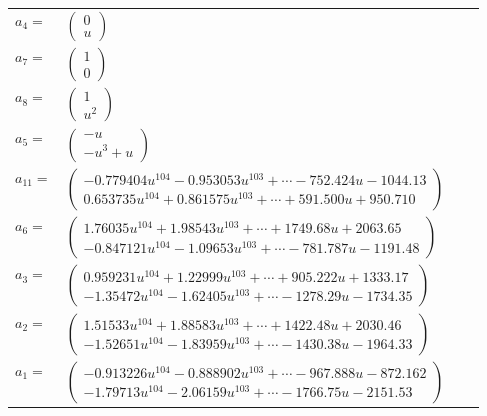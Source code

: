 \documentclass[1p]{elsarticle_modified}
\theoremstyle{definition}
\begin{document}
\begin{tabular}{m{7pt} m{180pt} m{7pt} m{180pt} }
\flushright $a_{4}=$&$\begin{pmatrix}0\\u\end{pmatrix}$ \\
\flushright $a_{7}=$&$\begin{pmatrix}1\\0\end{pmatrix}$ \\
\flushright $a_{8}=$&$\begin{pmatrix}1\\u^2\end{pmatrix}$ \\
\flushright $a_{5}=$&$\begin{pmatrix}- u\\- u^3+u\end{pmatrix}$ \\
\flushright $a_{11}=$&$\begin{pmatrix}-0.779404 u^{104}-0.953053 u^{103}+\cdots-752.424 u-1044.13\\0.653735 u^{104}+0.861575 u^{103}+\cdots+591.500 u+950.710\end{pmatrix}$ \\
\flushright $a_{6}=$&$\begin{pmatrix}1.76035 u^{104}+1.98543 u^{103}+\cdots+1749.68 u+2063.65\\-0.847121 u^{104}-1.09653 u^{103}+\cdots-781.787 u-1191.48\end{pmatrix}$ \\
\flushright $a_{3}=$&$\begin{pmatrix}0.959231 u^{104}+1.22999 u^{103}+\cdots+905.222 u+1333.17\\-1.35472 u^{104}-1.62405 u^{103}+\cdots-1278.29 u-1734.35\end{pmatrix}$ \\
\flushright $a_{2}=$&$\begin{pmatrix}1.51533 u^{104}+1.88583 u^{103}+\cdots+1422.48 u+2030.46\\-1.52651 u^{104}-1.83959 u^{103}+\cdots-1430.38 u-1964.33\end{pmatrix}$ \\
\flushright $a_{1}=$&$\begin{pmatrix}-0.913226 u^{104}-0.888902 u^{103}+\cdots-967.888 u-872.162\\-1.79713 u^{104}-2.06159 u^{103}+\cdots-1766.75 u-2151.53\end{pmatrix}$ \\

\end{tabular}
\end{document}
